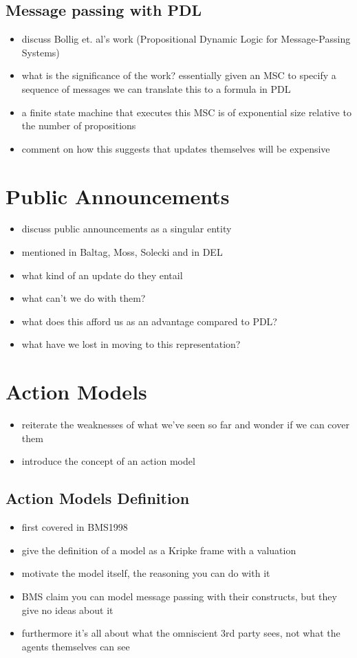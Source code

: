 \documentclass[10pt, a4paper, twoside]{article}
\begin{document}
\subsection{Message passing with PDL} \label{pdlMessages}
\begin{itemize}
\item discuss Bollig et. al's work (Propositional Dynamic Logic for
    Message-Passing Systems)
\item what is the significance of the work? essentially given an MSC to specify
a sequence of messages we can translate this to a formula in PDL
\item a finite state machine that executes this MSC is of exponential size
relative to the number of propositions
\item comment on how this suggests that updates themselves will be expensive
\end{itemize}

\section{Public Announcements}\label{announcements}
\begin{itemize}
\item discuss public announcements as a singular entity
\item mentioned in Baltag, Moss, Solecki and in DEL
\item what kind of an update do they entail
\item what can't we do with them?
\item what does this afford us as an advantage compared to PDL?
\item what have we lost in moving to this representation?
\end{itemize}

\section{Action Models}\label{actModels}
\begin{itemize}
  \item reiterate the weaknesses of what we've seen so far and wonder if we can
  cover them
  \item introduce the concept of an action model
\end{itemize}
\subsection{Action Models Definition}\label{actModelDefn}
\begin{itemize}
  \item first covered in BMS1998
  \item give the definition of a model as a Kripke frame with a valuation
  \item motivate the model itself, the reasoning you can do with it
  \item BMS claim you can model message passing with their constructs, but they
  give no ideas about it
  \item furthermore it's all about what the omniscient 3rd party sees, not what
  the agents themselves can see
\end{itemize}
\end{document}
